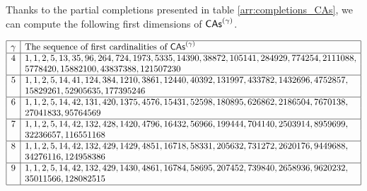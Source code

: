 Thanks to the partial completions presented in table
\eqref{arr:completions_CAs}, we can compute the following first 
dimensions of $\mathsf{CAs}^{\left(\gamma\right)}$.
\begin{center}
  \begin{math} \label{arr:dimensions_CAs}
    \begin{array}{|c|l|} 
      \hline
      \gamma & \mbox{The sequence of first cardinalities of } 
       \mathsf{CAs}^{\left(\gamma\right)}\\ \hline
      4 & 1, 1, 2, 5, 13, 35, 96, 264, 724, 1973, 5335, 14390, 38872,
          105141, 284929, 774254, 2111088,\\
        & 5778420, 15882100, 43837388, 121507230 \\ \hline
      5 & 1, 1, 2, 5, 14, 41, 124, 384, 1210, 3861, 12440, 40392, 131997,
          433782, 1432696, 4752857, \\ 
        & 15829261, 52905635, 177395246 \\ \hline
      6 & 1, 1, 2, 5, 14, 42, 131, 420, 1375, 4576, 15431, 52598, 180895,
          626862, 2186504, 7670138, \\ 
        & 27041833, 95764569 \\ \hline
      7 & 1, 1, 2, 5, 14, 42, 132, 428, 1420, 4796, 16432, 56966, 199444,
          704140, 2503914, 8959699, \\
        & 32236657, 116551168\\ \hline
      8 & 1, 1, 2, 5, 14, 42, 132, 429, 1429, 4851, 16718, 58331, 205632,
          731272, 2620176, 9449688, \\
        & 34276116, 124958386\\ \hline
      9 & 1, 1, 2, 5, 14, 42, 132, 429, 1430, 4861, 16784, 58695, 207452,
          739840, 2658936, 9620232, \\
        & 35011566, 128082515\\ \hline
    \end{array}
  \end{math}
\end{center}

